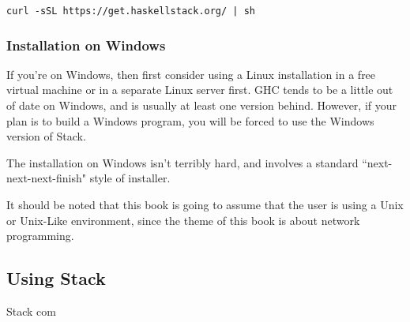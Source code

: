 \begin{verbatim}
curl -sSL https://get.haskellstack.org/ | sh
\end{verbatim}

\subsubsection{Installation on Windows}
If you're on Windows, then first consider using a Linux installation in a free virtual machine or in a separate Linux server first.  GHC tends to be a little out of date on Windows, and is usually at least one version behind. However, if your plan is to build a Windows program, you will be forced to use the Windows version of Stack. 

The installation on Windows isn't terribly hard, and involves a standard ``next-next-next-finish" style of installer. 

It should be noted that this book is going to assume that the user is using a Unix or Unix-Like environment, since the theme of this book is about network programming. 


\subsection{Using Stack}

Stack com

